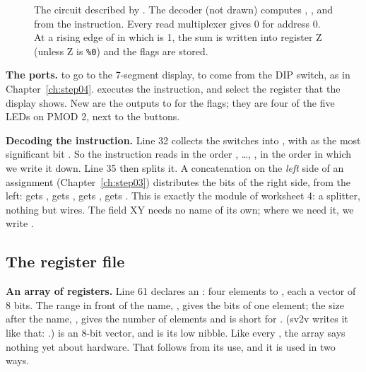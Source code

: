 {{\begin{figure}[ht]
\caption{The circuit described by . The decoder (not
drawn) computes , ,  and  from the
instruction. Every read multiplexer gives 0 for address 0. At a rising edge of
 in which  is 1, the sum  is written into register Z
(unless Z is \texttt{\%0}) and the flags are stored.}
\label{fig:step05-datapath}
\end{figure}


\textbf{The ports.}  to  go to the 7-segment display,  to
 come from the DIP switch, as in Chapter~\ref{ch:step04}. 
executes the instruction,  and  select the register that the
display shows. New are the outputs  to  for the flags; they
are four of the five LEDs on PMOD 2, next to the buttons.

\textbf{Decoding the instruction.} Line 32 collects the switches into
, with  as the most significant bit . So the
instruction reads in the order , \dots, , in the order in which
we write it down. Line 35 then splits it. A concatenation on the \emph{left}
side of an assignment (Chapter~\ref{ch:step03}) distributes the bits of the
right side, from the left:  gets ,  gets
,  gets ,  gets .
This is exactly the  module of worksheet 4: a splitter,
nothing but wires. The field XY needs no name of its own; where we need it, we
write .

\subsection*{The register file}


\textbf{An array of registers.} Line 61 declares an : four
elements  to , each a vector of 8 bits. The
range in front of the name, \cc{[7:0]}, gives the bits of one element; the
size after the name, \cc{[4]}, gives the number of elements and is short for
\cc{[0:3]}. (sv2v writes it like that: .)
 is an 8-bit vector, and  is its low
nibble. Like every , the array says nothing yet about hardware. That
follows from its use, and it is used in two ways.

}}
